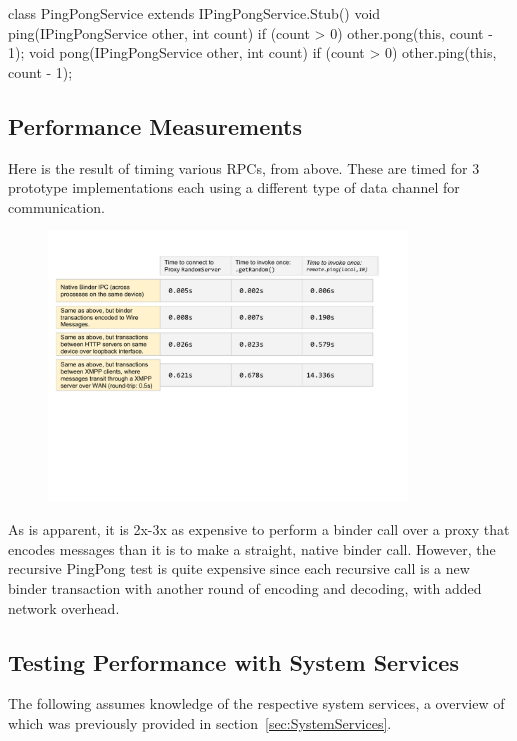 \documentclass[prodmode]{acmlarge}
\begin{document}
\begin{snippet}
class PingPongService extends
    IPingPongService.Stub() {
  void ping(IPingPongService other, int count) {
    if (count > 0) other.pong(this, count - 1);
  }
  void pong(IPingPongService other, int count) {
    if (count > 0) other.ping(this, count - 1);
  }
}
\end{snippet}

\subsection{Performance Measurements}
Here is the result of timing various RPCs, from above. These are timed for 3 prototype implementations each using a different type of data channel for communication.

\begin{figure}[h]
\centering
\includegraphics[width=0.85\textwidth]{drawings/Performance.pdf}
\end{figure}

As is apparent, it is 2x-3x as expensive to perform a binder call over a proxy that encodes messages than it is to make a straight, native binder call. However, the recursive PingPong test is quite expensive since each recursive call is a new binder transaction with another round of encoding and decoding, with added network overhead.

\subsection{Testing Performance with System Services}

The following assumes knowledge of the respective system services, a overview of which was previously provided in section~\ref{sec:SystemServices}.
\end{document}
